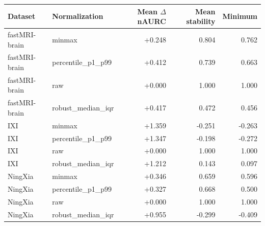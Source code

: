 \begin{tabular}{llrrr}
\toprule
Dataset & Normalization & Mean $\Delta$nAURC & Mean stability & Minimum \\
\midrule
fastMRI-brain & minmax & +0.248 & 0.804 & 0.762 \\
fastMRI-brain & percentile\_p1\_p99 & +0.412 & 0.739 & 0.663 \\
fastMRI-brain & raw & +0.000 & 1.000 & 1.000 \\
fastMRI-brain & robust\_median\_iqr & +0.417 & 0.472 & 0.456 \\
IXI & minmax & +1.359 & -0.251 & -0.263 \\
IXI & percentile\_p1\_p99 & +1.347 & -0.198 & -0.272 \\
IXI & raw & +0.000 & 1.000 & 1.000 \\
IXI & robust\_median\_iqr & +1.212 & 0.143 & 0.097 \\
NingXia & minmax & +0.346 & 0.659 & 0.596 \\
NingXia & percentile\_p1\_p99 & +0.327 & 0.668 & 0.500 \\
NingXia & raw & +0.000 & 1.000 & 1.000 \\
NingXia & robust\_median\_iqr & +0.955 & -0.299 & -0.409 \\
\bottomrule
\end{tabular}
